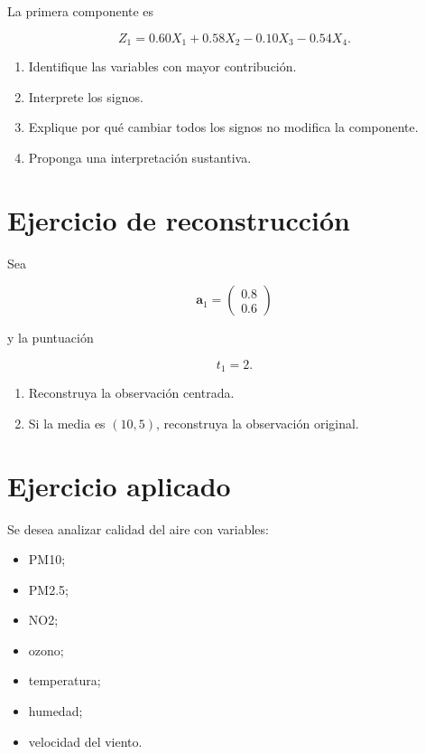 \documentclass[
  spanish,
  10.5pt,
  letterpaper,
  DIV=11,
  numbers=noendperiod,
  oneside,
  open=any]{scrreprt}
\providecommand{\tightlist}{%
  \setlength{\itemsep}{0pt}\setlength{\parskip}{0pt}}
\theoremstyle{definition}
\theoremstyle{definition}
\theoremstyle{plain}
\theoremstyle{remark}
\begin{document}

La primera componente es

\[
Z_1
=
0.60X_1
+
0.58X_2
-
0.10X_3
-
0.54X_4.
\]

\begin{enumerate}
\def\labelenumi{\arabic{enumi}.}
\tightlist
\item
  Identifique las variables con mayor contribución.
\item
  Interprete los signos.
\item
  Explique por qué cambiar todos los signos no modifica la componente.
\item
  Proponga una interpretación sustantiva.
\end{enumerate}

\section*{Ejercicio de
reconstrucción}\label{ejercicio-de-reconstrucciuxf3n}


Sea

\[
\mathbf{a}_1
=
\begin{pmatrix}
0.8\\
0.6
\end{pmatrix}
\]

y la puntuación

\[
t_1=2.
\]

\begin{enumerate}
\def\labelenumi{\arabic{enumi}.}
\tightlist
\item
  Reconstruya la observación centrada.
\item
  Si la media es \((10,5)\), reconstruya la observación original.
\end{enumerate}

\section*{Ejercicio aplicado}\label{ejercicio-aplicado-13}


Se desea analizar calidad del aire con variables:

\begin{itemize}
\tightlist
\item
  PM10;
\item
  PM2.5;
\item
  NO2;
\item
  ozono;
\item
  temperatura;
\item
  humedad;
\item
  velocidad del viento.
\end{itemize}
\end{document}
